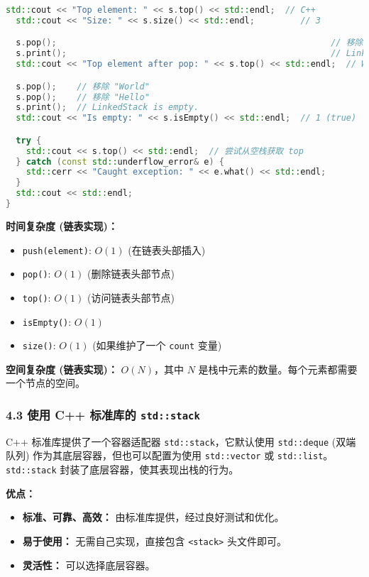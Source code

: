 \begin{lstlisting}[language=C++]
  std::cout << "Top element: " << s.top() << std::endl;  // C++
  std::cout << "Size: " << s.size() << std::endl;         // 3

  s.pop();                                                      // 移除 "C++"
  s.print();                                                    // LinkedStack (top to bottom): World Hello
  std::cout << "Top element after pop: " << s.top() << std::endl;  // World

  s.pop();    // 移除 "World"
  s.pop();    // 移除 "Hello"
  s.print();  // LinkedStack is empty.
  std::cout << "Is empty: " << s.isEmpty() << std::endl;  // 1 (true)

  try {
    std::cout << s.top() << std::endl;  // 尝试从空栈获取 top
  } catch (const std::underflow_error& e) {
    std::cerr << "Caught exception: " << e.what() << std::endl;
  }
  std::cout << std::endl;
}
\end{lstlisting}
\textbf{时间复杂度 (链表实现)：}

\begin{itemize}
	\item \lstinline{push(element)}: $O(1)$ (在链表头部插入)
	\item \lstinline{pop()}: $O(1)$ (删除链表头部节点)
	\item \lstinline{top()}: $O(1)$ (访问链表头部节点)
	\item \lstinline{isEmpty()}: $O(1)$
	\item \lstinline{size()}: $O(1)$ (如果维护了一个 \lstinline{count} 变量)
\end{itemize}

\textbf{空间复杂度 (链表实现)：} $O(N)$，其中 $N$ 是栈中元素的数量。每个元素都需要一个节点的空间。

\subsubsection{4.3 使用 C++ 标准库的 \lstinline{std::stack}}

C++ 标准库提供了一个容器适配器 \lstinline{std::stack}，它默认使用 \lstinline{std::deque} (双端队列) 作为其底层容器，但也可以配置为使用 \lstinline{std::vector} 或 \lstinline{std::list}。\lstinline{std::stack} 封装了底层容器，使其表现出栈的行为。

\textbf{优点：}

\begin{itemize}
	\item \textbf{标准、可靠、高效：} 由标准库提供，经过良好测试和优化。
	\item \textbf{易于使用：} 无需自己实现，直接包含 \lstinline{<stack>} 头文件即可。
	\item \textbf{灵活性：} 可以选择底层容器。
\end{itemize}

